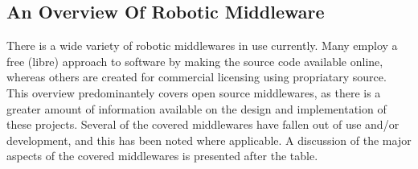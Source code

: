 \documentclass[../dissertation.tex]{subfiles}
\begin{document}
\subsection{An Overview Of Robotic Middleware}
\label{overview-of-robotic-middleware}

There is a wide variety of robotic middlewares in use currently. Many employ a free (libre) approach to software by making the source code available online, whereas others are created for commercial licensing using propriatary source. This overview predominantely covers open source middlewares, as there is a greater amount of information available on the design and implementation of these projects. Several of the covered middlewares have fallen out of use and/or development, and this has been noted where applicable. A discussion of the major aspects of the covered middlewares is presented after the table.
\end{document}

